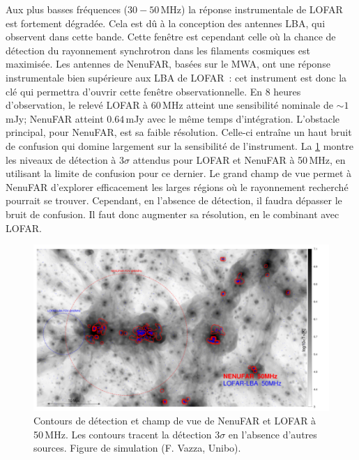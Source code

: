 \pg
Aux plus basses fr\'equences ($30-50$\,MHz) la r\'eponse instrumentale de LOFAR est fortement d\'egrad\'ee. Cela est d\^u \`a la conception des antennes LBA, qui observent dans cette bande. Cette fen\^etre est cependant celle o\`u la chance de d\'etection du rayonnement synchrotron dans les filaments cosmiques est maximis\'ee. Les antennes de NenuFAR, bas\'ees sur le MWA, ont une r\'eponse instrumentale bien sup\'erieure aux LBA de LOFAR~: cet instrument est donc la cl\'e qui permettra d'ouvrir cette fen\^etre observationnelle. En 8 heures d'observation, le relev\'e LOFAR \`a 60\,MHz atteint une sensibilit\'e nominale de $\sim1$\,mJy; NenuFAR atteint $0.64$\,mJy avec le m\^eme temps d'int\'egration. 
L'obstacle principal, pour NenuFAR, est sa faible r\'esolution. Celle-ci entra\^ine un haut bruit de confusion \cite{1959IAUS....9..475R, 1957PCPS...53..764S} qui domine largement sur la sensibilit\'e de l'instrument. La \cref{fig.franco.sensitivity} montre les niveaux de d\'etection \`a 3$\sigma$ attendus pour LOFAR et NenuFAR \`a 50\,MHz, en utilisant la limite de confusion pour ce dernier. Le grand champ de vue permet \`a NenuFAR d'explorer efficacement les larges r\'egions o\`u le rayonnement recherch\'e pourrait se trouver. Cependant, en l'absence de d\'etection, il faudra d\'epasser le bruit de confusion. Il faut donc augmenter sa r\'esolution, en le combinant avec LOFAR.



\begin{figure}[h!]
	\centering
	\includegraphics[width=.95\linewidth]{ProjetRecherche_futur/detection.png}
	\caption{Contours de d\'etection et champ de vue de NenuFAR et LOFAR \`a 50\,MHz. Les contours tracent la d\'etection 3$\sigma$ en l'absence d'autres sources. Figure de simulation (F. Vazza, Unibo).} \label{fig.franco.sensitivity}
\end{figure}


